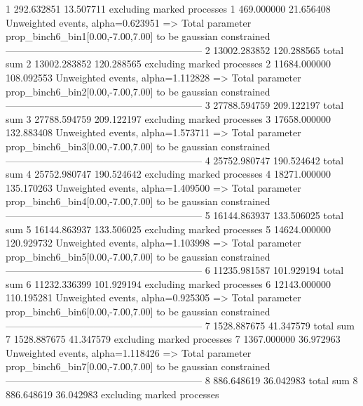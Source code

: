 1          292.632851      13.507711       excluding marked processes    
1          469.000000      21.656408       Unweighted events, alpha=0.623951
  => Total parameter prop_binch6_bin1[0.00,-7.00,7.00] to be gaussian constrained
------------------------------------------------------------
2          13002.283852    120.288565      total sum                     
2          13002.283852    120.288565      excluding marked processes    
2          11684.000000    108.092553      Unweighted events, alpha=1.112828
  => Total parameter prop_binch6_bin2[0.00,-7.00,7.00] to be gaussian constrained
------------------------------------------------------------
3          27788.594759    209.122197      total sum                     
3          27788.594759    209.122197      excluding marked processes    
3          17658.000000    132.883408      Unweighted events, alpha=1.573711
  => Total parameter prop_binch6_bin3[0.00,-7.00,7.00] to be gaussian constrained
------------------------------------------------------------
4          25752.980747    190.524642      total sum                     
4          25752.980747    190.524642      excluding marked processes    
4          18271.000000    135.170263      Unweighted events, alpha=1.409500
  => Total parameter prop_binch6_bin4[0.00,-7.00,7.00] to be gaussian constrained
------------------------------------------------------------
5          16144.863937    133.506025      total sum                     
5          16144.863937    133.506025      excluding marked processes    
5          14624.000000    120.929732      Unweighted events, alpha=1.103998
  => Total parameter prop_binch6_bin5[0.00,-7.00,7.00] to be gaussian constrained
------------------------------------------------------------
6          11235.981587    101.929194      total sum                     
6          11232.336399    101.929194      excluding marked processes    
6          12143.000000    110.195281      Unweighted events, alpha=0.925305
  => Total parameter prop_binch6_bin6[0.00,-7.00,7.00] to be gaussian constrained
------------------------------------------------------------
7          1528.887675     41.347579       total sum                     
7          1528.887675     41.347579       excluding marked processes    
7          1367.000000     36.972963       Unweighted events, alpha=1.118426
  => Total parameter prop_binch6_bin7[0.00,-7.00,7.00] to be gaussian constrained
------------------------------------------------------------
8          886.648619      36.042983       total sum                     
8          886.648619      36.042983       excluding marked processes    
